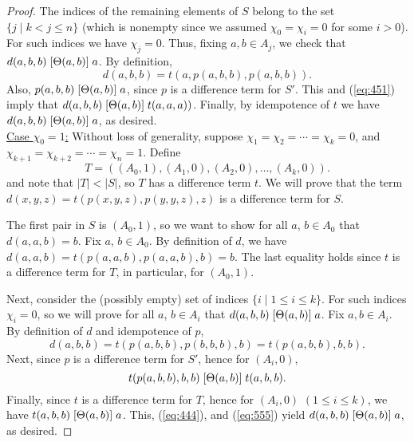 \begin{proof}
The indices of the remaining elements of $S$
belong to the set $\{j \mid k<j\leq n\}$ (which is nonempty since we
assumed $\chi_0 = \chi_i = 0$ for some $i>0$).
For such indices we have $\chi_j = 0$.
Thus, fixing $a, b \in A_j$, we check that
$d(a,b,b)\mathrel{[\Theta(a,b)]} a$.
By definition,
\begin{equation}
  \label{eq:451}
d(a,b,b) =t(a, p(a,b,b), p(a,b,b)).
\end{equation}
Also, $p(a,b,b) \mathrel{[\Theta(a,b)]} a$,
since $p$ is a \glocal difference term for $S'$.
This and (\ref{eq:451}) imply
that
$d(a, b,b) \mathrel{[\Theta(a,b)]} t(a,a,a))$.
Finally, by idempotence of $t$ we have
$d(a,b,b)\mathrel{[\Theta(a,b)]} a$,
as desired.
\\[4pt]
\underline{Case $\chi_0 = 1$:}
Without loss of generality, suppose $\chi_1 = \chi_2 =\cdots =\chi_k = 0$,
and $\chi_{k+1} = \chi_{k+2} = \cdots = \chi_{n} = 1$.
Define
\[
T = ((A_0, 1), (A_1, 0), (A_2, 0), \dots, (A_k, 0)).
\]
and note that $|T| < |S|$, so $T$ has a \glocal difference term $t$.
We will prove that the term $d(x,y,z) = t(p(x,y,z), p(y,y,z), z)$
is a \glocal difference term for $S$.

The first pair in $S$ is $(A_0, 1)$, so we want to show for all $a$, $b \in A_0$ that
$d(a,a,b) = b$.
Fix $a$, $b \in A_0$. By definition of $d$,
we have $d(a,a,b) = t(p(a,a,b), p(a,a,b), b) =b$.
The last equality holds since $t$ is a \glocal difference term for $T$, in particular,
for $(A_0, 1)$.

Next, consider the (possibly empty) set of indices $\{i \mid 1\leq i \leq k\}$.
For such indices $\chi_i =0$, so we will prove
for all $a$, $b \in A_i$ that
$d(a,b,b) \mathrel{[\Theta(a,b)]} a$.
Fix $a, b\in A_i$.
By definition of $d$ and idempotence of $p$,
\begin{equation}
\label{eq:444}
  d(a,b,b) = t(p(a,b,b), p(b,b,b), b) =t(p(a,b,b), b, b).
\end{equation}
Next, since $p$ is a \glocal difference term for $S'$,
hence for $(A_i, 0)$,
\begin{equation}
  \label{eq:555}
  t(p(a,b,b), b, b)
 \mathrel{[\Theta(a,b)]}
 t(a, b, b).
\end{equation}
Finally, since $t$ is a \glocal difference term for $T$, hence for
$(A_i, 0)$  $(1\leq i \leq k)$, we have  %
$t(a, b, b) \mathrel{[\Theta(a,b)]} a$.
This, (\ref{eq:444}), and (\ref{eq:555}) yield
$d(a,b,b) \mathrel{[\Theta(a,b)]} a$,
as desired.


\end{proof}
